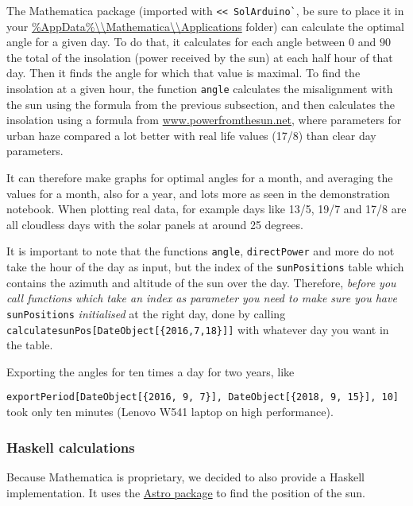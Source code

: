 The Mathematica package (imported with \verb|<< SolArduino`|, be sure to place it in your
\url{\%AppData\%\\Mathematica\\Applications} folder) can calculate the optimal angle for a given day.
To do that, it calculates for each angle between $0$ and $90$ the total of the insolation (power received by the sun) at each half hour of that day.
Then it finds the angle for which that value is maximal.
To find the insolation at a given hour, the function \verb|angle| calculates the misalignment with the sun using the formula from the previous subsection, and then calculates the insolation using a formula from \href{http://www.powerfromthesun.net/Book/chapter02/chapter02.html#ZEqnNum929295 }{www.powerfromthesun.net}, where parameters for urban haze compared a lot better with real life values (17/8) than clear day parameters.

It can therefore make graphs for optimal angles for a month, and averaging the values for a month, also for a year, and lots more as seen in the demonstration notebook.
When plotting real data, for example days like 13/5, 19/7 and 17/8 are all cloudless days with the solar panels at around 25 degrees.

It is important to note that the functions \verb|angle|, \verb|directPower| and more do not take the hour of the day as input, but the index of the \verb|sunPositions| table which contains the azimuth and altitude of the sun over the day.
Therefore, \textit{before you call functions which take an index as parameter you need to make sure you have }\verb|sunPositions| \textit{initialised} at the right day, done by calling \verb|calculatesunPos[DateObject[{2016,7,18}]]| with whatever day you want in the table.

Exporting the angles for ten times a day for two years, like

\verb|exportPeriod[DateObject[{2016, 9, 7}], DateObject[{2018, 9, 15}], 10]| took only ten minutes (Lenovo W541 laptop on high performance).

\subsubsection{Haskell calculations}

Because Mathematica is proprietary, we decided to also provide a Haskell implementation.
It uses the \href{https://hackage.haskell.org/package/astro}{Astro package} to find the position of the sun.